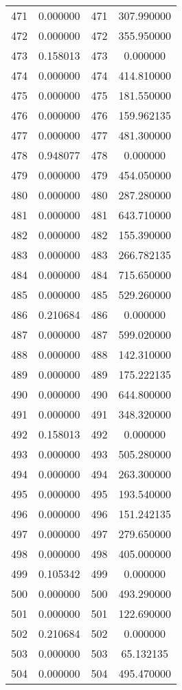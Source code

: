 \documentclass[12pt]{article}
\begin{document}
\begin{longtable}{@{}cccc@{}}
471 & 0.000000 & 471 & 307.990000 \\
472 & 0.000000 & 472 & 355.950000 \\
473 & 0.158013 & 473 & 0.000000 \\
474 & 0.000000 & 474 & 414.810000 \\
475 & 0.000000 & 475 & 181.550000 \\
476 & 0.000000 & 476 & 159.962135 \\
477 & 0.000000 & 477 & 481.300000 \\
478 & 0.948077 & 478 & 0.000000 \\
479 & 0.000000 & 479 & 454.050000 \\
480 & 0.000000 & 480 & 287.280000 \\
481 & 0.000000 & 481 & 643.710000 \\
482 & 0.000000 & 482 & 155.390000 \\
483 & 0.000000 & 483 & 266.782135 \\
484 & 0.000000 & 484 & 715.650000 \\
485 & 0.000000 & 485 & 529.260000 \\
486 & 0.210684 & 486 & 0.000000 \\
487 & 0.000000 & 487 & 599.020000 \\
488 & 0.000000 & 488 & 142.310000 \\
489 & 0.000000 & 489 & 175.222135 \\
490 & 0.000000 & 490 & 644.800000 \\
491 & 0.000000 & 491 & 348.320000 \\
492 & 0.158013 & 492 & 0.000000 \\
493 & 0.000000 & 493 & 505.280000 \\
494 & 0.000000 & 494 & 263.300000 \\
495 & 0.000000 & 495 & 193.540000 \\
496 & 0.000000 & 496 & 151.242135 \\
497 & 0.000000 & 497 & 279.650000 \\
498 & 0.000000 & 498 & 405.000000 \\
499 & 0.105342 & 499 & 0.000000 \\
500 & 0.000000 & 500 & 493.290000 \\
501 & 0.000000 & 501 & 122.690000 \\
502 & 0.210684 & 502 & 0.000000 \\
503 & 0.000000 & 503 & 65.132135 \\
504 & 0.000000 & 504 & 495.470000 \\

\end{longtable}
\end{document}
